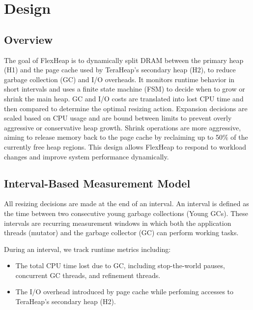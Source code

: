 \section{Design}

\subsection{Overview}

The goal of FlexHeap is to dynamically split DRAM between the primary heap (H1)
and the page cache used by TeraHeap’s secondary heap (H2), to reduce garbage
collection (GC) and I/O overheads. It monitors runtime behavior in short
intervals and uses a finite state machine (FSM) to decide when to grow or
shrink the main heap. GC and I/O costs are translated into lost CPU time and
then compared to determine the optimal resizing action. Expansion decisions are
scaled based on CPU usage and are bound between limits to prevent overly
aggressive or conservative heap growth. Shrink operations are more aggressive,
aiming to release memory back to the page cache by reclaiming up to 50\% of the
currently free heap regions. This design allows FlexHeap to respond to workload
changes and improve system performance dynamically.

\subsection{Interval-Based Measurement Model}

All resizing decisions are made at the end of an interval. An interval is
defined as the time between two consecutive young  garbage collections
(Young GCs). These intervals are recurring measurement windows in which both the
application threads (mutator) and the garbage collector (GC) can perform
working tasks. 

During an interval, we track runtime metrics including:
\begin{itemize}
	\item The total CPU time lost due to GC, including stop-the-world pauses, concurrent GC threads, and refinement threads.
	\item The I/O overhead introduced by page cache while perfoming accesses to TeraHeap's secondary heap (H2).
\end{itemize}

